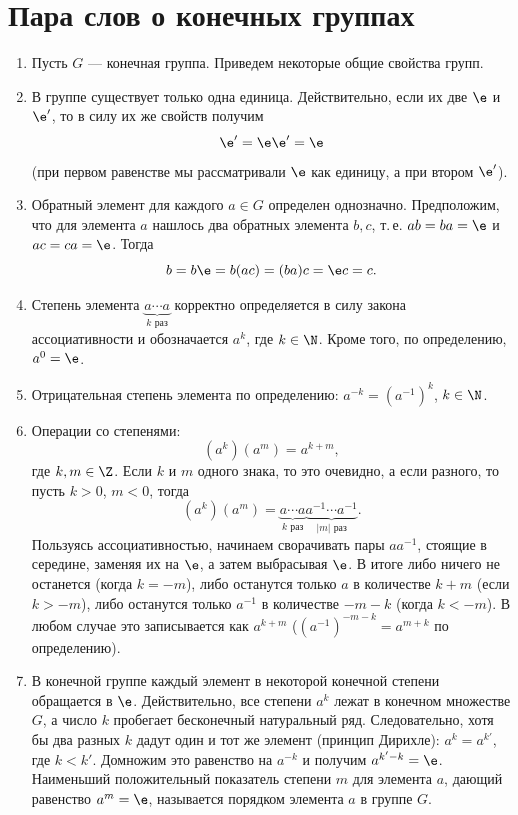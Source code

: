 \section{Пара слов о конечных группах}



\begin{enumerate}

\item Пусть $G$ --- конечная группа. Приведем некоторые общие свойства групп.

\item В группе существует только одна единица. Действительно, если их две $\e$ и $\e'$, то в силу их же свойств получим
$$
\e' = \e\e' = \e
$$
(при первом равенстве мы рассматривали $\e$ как единицу, а при втором $\e'$).
\item Обратный элемент для каждого $a\in G$ определен однозначно. Предположим, что для элемента $a$ нашлось два обратных элемента $b,c$, т.\,е. $ab=ba=\e$ и $ac=ca=\e$. Тогда
$$
b=b\e=b(ac)=(ba)c=\e c=c.
$$
\item Степень элемента $\underbrace{a\cdots a}_{k\mbox{ раз}}$ корректно определяется в силу закона ассоциативности и обозначается $a^k$, где $k\in\N$. Кроме того, по определению, $a^0=\e$.
\item Отрицательная степень элемента по определению: $a^{-k}=(a^{-1})^k$, $k\in\N$.
\item Операции со степенями:
$$
(a^k)(a^m)=a^{k+m},
$$
где $k,m\in \Z$. Если $k$ и $m$ одного знака, то это очевидно, а если разного, то пусть $k>0$, $m<0$, тогда
$$
(a^k)(a^m) = \underbrace{a\cdots a}_{k\mbox{ раз}}\underbrace{a^{-1}\cdots a^{-1}}_{|m|\mbox{ раз}}.
$$
Пользуясь ассоциативностью, начинаем сворачивать пары $aa^{-1}$, стоящие в середине, заменяя их на $\e$, а затем выбрасывая $\e$. В итоге либо ничего не останется (когда $k=-m$), либо останутся только $a$ в количестве $k+m$ (если $k>-m$), либо останутся только $a^{-1}$ в количестве $-m-k$ (когда $k<-m$). В любом случае это записывается как $a^{k+m}$ ($(a^{-1})^{-m-k}=a^{m+k}$ по определению).


\item В конечной группе каждый элемент в некоторой конечной степени обращается в $\e$. Действительно, все степени $a^k$ лежат в конечном множестве $G$, а число $k$ пробегает бесконечный натуральный ряд. Следовательно, хотя бы два разных $k$ дадут один и тот же элемент (принцип Дирихле): $a^k=a^{k'}$, где $k<k'$. Домножим это равенство на $a^{-k}$ и получим $a^{k'-k}=\e$. Наименьший положительный показатель степени $m$ для элемента $a$, дающий равенство $a^m=\e$, называется порядком элемента $a$ в группе $G$.


\end{enumerate}
